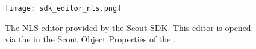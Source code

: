 %

\begin{figure}
\texttt{[image: sdk\_editor\_nls.png]}
\caption{The NLS editor provided by the Scout SDK. This editor is opened via the  in the Scout Object Properties of the .}
\end{figure}

